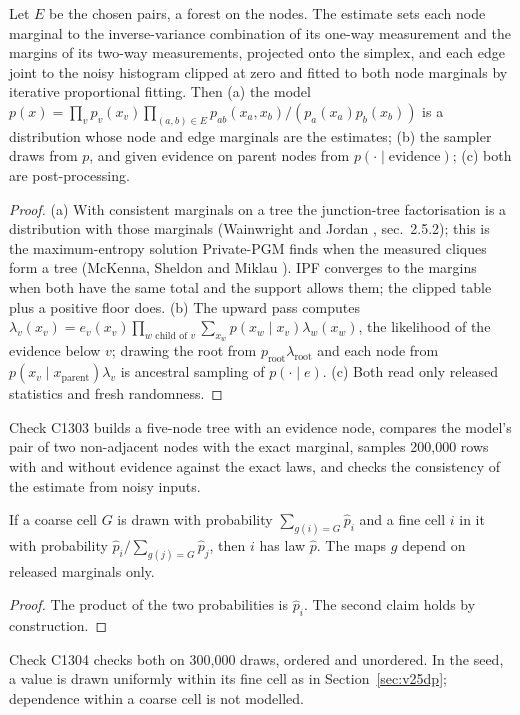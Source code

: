 \setcounter{proposition}{1302}
\begin{proposition}\label{prop:dpforest}
Let $E$ be the chosen pairs, a forest on the nodes. The estimate sets each node marginal to the inverse-variance combination of its one-way measurement and the margins of its two-way measurements, projected onto the simplex, and each edge joint to the noisy histogram clipped at zero and fitted to both node marginals by iterative proportional fitting. Then (a) the model $p(x)=\prod_v p_v(x_v)\prod_{(a,b)\in E}p_{ab}(x_a,x_b)/(p_a(x_a)p_b(x_b))$ is a distribution whose node and edge marginals are the estimates; (b) the sampler draws from $p$, and given evidence on parent nodes from $p(\cdot\mid\text{evidence})$; (c) both are post-processing.
\end{proposition}
\begin{proof}
(a) With consistent marginals on a tree the junction-tree factorisation is a distribution with those marginals (Wainwright and Jordan \cite{wainwright2008}, sec.~2.5.2); this is the maximum-entropy solution Private-PGM finds when the measured cliques form a tree (McKenna, Sheldon and Miklau \cite{mckenna2019pgm}). IPF converges to the margins when both have the same total and the support allows them; the clipped table plus a positive floor does. (b) The upward pass computes $\lambda_v(x_v)=e_v(x_v)\prod_{w\text{ child of }v}\sum_{x_w}p(x_w\mid x_v)\lambda_w(x_w)$, the likelihood of the evidence below $v$; drawing the root from $p_{\text{root}}\lambda_{\text{root}}$ and each node from $p(x_v\mid x_{\text{parent}})\lambda_v$ is ancestral sampling of $p(\cdot\mid e)$. (c) Both read only released statistics and fresh randomness.
\end{proof}
\noindent Check C1303 builds a five-node tree with an evidence node, compares the model's pair of two non-adjacent nodes with the exact marginal, samples 200,000 rows with and without evidence against the exact laws, and checks the consistency of the estimate from noisy inputs.

\setcounter{proposition}{1303}
\begin{proposition}\label{prop:dpcompress}
If a coarse cell $G$ is drawn with probability $\sum_{g(i)=G}\hat p_i$ and a fine cell $i$ in it with probability $\hat p_i/\sum_{g(j)=G}\hat p_j$, then $i$ has law $\hat p$. The maps $g$ depend on released marginals only.
\end{proposition}
\begin{proof}
The product of the two probabilities is $\hat p_i$. The second claim holds by construction.
\end{proof}
\noindent Check C1304 checks both on 300,000 draws, ordered and unordered. In the seed, a value is drawn uniformly within its fine cell as in Section~\ref{sec:v25dp}; dependence within a coarse cell is not modelled.

